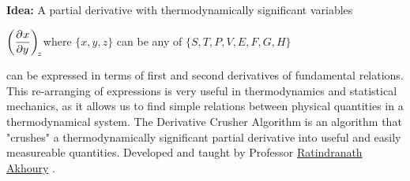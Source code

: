 \documentclass{article}
\date{Winter 2022}
\author{\small Typed in \LaTeX\ by \EC}
\def\Akhoury{
    \hyperlink{
        https://lsa.umich.edu/physics/people/faculty/akhoury.html
    }{Ratindranath Akhoury}
    }
\begin{document}
\maketitle\thispagestyle{fancy}
\noindent\textbf{Idea:} A partial derivative with thermodynamically significant variables
    \begin{center}
        $\displaystyle\pder{x}{y}[z]$ where $\{x,y,z\}$ can be any of $\{S,T,P,V,E,F,G,H\}$
    \end{center}
    can be expressed in terms of first and second derivatives of fundamental relations. This re-arranging of expressions is very useful in thermodynamics and statistical mechanics, as it allows us to find simple relations between physical quantities in a thermodynamical system. The 
    Derivative Crusher Algorithm is an algorithm that "crushes" a thermodynamically significant partial derivative into useful and easily measureable quantities. Developed and taught by Professor \Akhoury.
\end{document}
